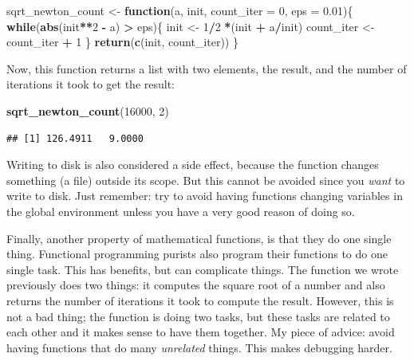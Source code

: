 \documentclass[]{gitbook}
\newenvironment{Shaded}{\begin{snugshade}}{\end{snugshade}}
\newcommand{\ControlFlowTok}[1]{\textcolor[rgb]{0.13,0.29,0.53}{\textbf{#1}}}
\newcommand{\DataTypeTok}[1]{\textcolor[rgb]{0.13,0.29,0.53}{#1}}
\newcommand{\DecValTok}[1]{\textcolor[rgb]{0.00,0.00,0.81}{#1}}
\newcommand{\FloatTok}[1]{\textcolor[rgb]{0.00,0.00,0.81}{#1}}
\newcommand{\KeywordTok}[1]{\textcolor[rgb]{0.13,0.29,0.53}{\textbf{#1}}}
\newcommand{\NormalTok}[1]{#1}
\newcommand{\OperatorTok}[1]{\textcolor[rgb]{0.81,0.36,0.00}{\textbf{#1}}}
\newcommand{\StringTok}[1]{\textcolor[rgb]{0.31,0.60,0.02}{#1}}
\theoremstyle{definition}
\theoremstyle{definition}
\theoremstyle{definition}
\theoremstyle{remark}
\begin{document}
\begin{Shaded}
\begin{Highlighting}[]
\NormalTok{sqrt_newton_count <-}\StringTok{ }\ControlFlowTok{function}\NormalTok{(a, init, }\DataTypeTok{count_iter =} \DecValTok{0}\NormalTok{, }\DataTypeTok{eps =} \FloatTok{0.01}\NormalTok{)\{}
    \ControlFlowTok{while}\NormalTok{(}\KeywordTok{abs}\NormalTok{(init}\OperatorTok{**}\DecValTok{2} \OperatorTok{-}\StringTok{ }\NormalTok{a) }\OperatorTok{>}\StringTok{ }\NormalTok{eps)\{}
\NormalTok{        init <-}\StringTok{ }\DecValTok{1}\OperatorTok{/}\DecValTok{2} \OperatorTok{*}\NormalTok{(init }\OperatorTok{+}\StringTok{ }\NormalTok{a}\OperatorTok{/}\NormalTok{init)}
\NormalTok{        count_iter <-}\StringTok{ }\NormalTok{count_iter }\OperatorTok{+}\StringTok{ }\DecValTok{1}
\NormalTok{    \}}
    \KeywordTok{return}\NormalTok{(}\KeywordTok{c}\NormalTok{(init, count_iter))}
\NormalTok{\}}
\end{Highlighting}
\end{Shaded}

Now, this function returns a list with two elements, the result, and the
number of iterations it took to get the result:

\begin{Shaded}
\begin{Highlighting}[]
\KeywordTok{sqrt_newton_count}\NormalTok{(}\DecValTok{16000}\NormalTok{, }\DecValTok{2}\NormalTok{)}
\end{Highlighting}
\end{Shaded}

\begin{verbatim}
## [1] 126.4911   9.0000
\end{verbatim}

Writing to disk is also considered a side effect, because the function
changes something (a file) outside its scope. But this cannot be avoided
since you \emph{want} to write to disk. Just remember: try to avoid
having functions changing variables in the global environment unless you
have a very good reason of doing so.

Finally, another property of mathematical functions, is that they do one
single thing. Functional programming purists also program their
functions to do one single task. This has benefits, but can complicate
things. The function we wrote previously does two things: it computes
the square root of a number and also returns the number of iterations it
took to compute the result. However, this is not a bad thing; the
function is doing two tasks, but these tasks are related to each other
and it makes sense to have them together. My piece of advice: avoid
having functions that do many \emph{unrelated} things. This makes
debugging harder.
\end{document}
